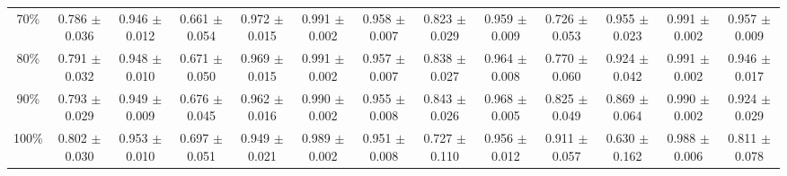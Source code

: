 \documentclass[11pt]{article}
\begin{document}
\begin{table}[ht]
{\begin{tabular}{ccccccccccccc}
70\% & 0.786 $\pm$ 0.036 & 0.946 $\pm$ 0.012 & 0.661 $\pm$ 0.054 & 0.972 $\pm$ 0.015 & 0.991 $\pm$ 0.002 & 0.958 $\pm$ 0.007 & 0.823 $\pm$ 0.029 & 0.959 $\pm$ 0.009 & 0.726 $\pm$ 0.053 & 0.955 $\pm$ 0.023 & 0.991 $\pm$ 0.002 & 0.957 $\pm$ 0.009 \\
80\% & 0.791 $\pm$ 0.032 & 0.948 $\pm$ 0.010 & 0.671 $\pm$ 0.050 & 0.969 $\pm$ 0.015 & 0.991 $\pm$ 0.002 & 0.957 $\pm$ 0.007 & 0.838 $\pm$ 0.027 & 0.964 $\pm$ 0.008 & 0.770 $\pm$ 0.060 & 0.924 $\pm$ 0.042 & 0.991 $\pm$ 0.002 & 0.946 $\pm$ 0.017 \\
90\% & 0.793 $\pm$ 0.029 & 0.949 $\pm$ 0.009 & 0.676 $\pm$ 0.045 & 0.962 $\pm$ 0.016 & 0.990 $\pm$ 0.002 & 0.955 $\pm$ 0.008 & 0.843 $\pm$ 0.026 & 0.968 $\pm$ 0.005 & 0.825 $\pm$ 0.049 & 0.869 $\pm$ 0.064 & 0.990 $\pm$ 0.002 & 0.924 $\pm$ 0.029 \\
100\% & 0.802 $\pm$ 0.030 & 0.953 $\pm$ 0.010 & 0.697 $\pm$ 0.051 & 0.949 $\pm$ 0.021 & 0.989 $\pm$ 0.002 & 0.951 $\pm$ 0.008 & 0.727 $\pm$ 0.110 & 0.956 $\pm$ 0.012 & 0.911 $\pm$ 0.057 & 0.630 $\pm$ 0.162 & 0.988 $\pm$ 0.006 & 0.811 $\pm$ 0.078 \\
\bottomrule
\end{tabular}
}
\end{table}

\clearpage
\end{document}
